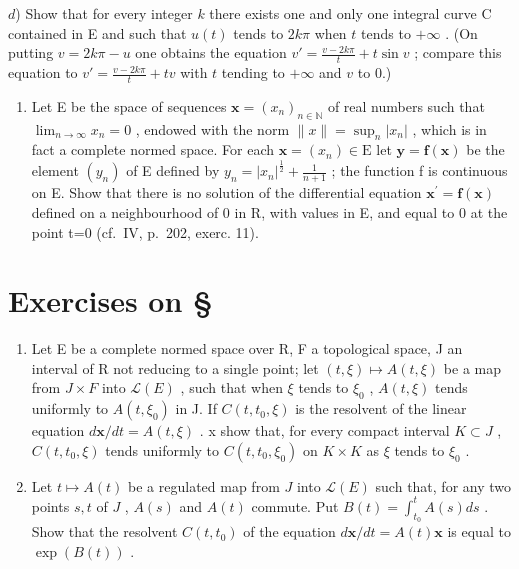 \(d\)) Show that for every integer \(k\) there exists one and only one integral curve C contained in E and such that \(u(t)\) tends to \(2k\pi\) when \(t\) tends to \(+\infty\) . (On putting \(v = 2k\pi - u\) one obtains the equation \(v' = \frac{v - 2k\pi}{t} + t \sin v\) ; compare this equation to \(v' = \frac{v - 2k\pi}{t} + tv\) with \(t\) tending to \(+\infty\) and \(v\) to 0.)

\begin{enumerate}
\def\labelenumi{\arabic{enumi})}
\setcounter{enumi}{17}
\tightlist
\item
  Let E be the space of sequences \(\mathbf{x}=(x_{n})_{n\in\mathbb{N}}\) of real numbers such that \(\lim_{n\to\infty}x_{n}=0\) , endowed with the norm \(\|x\|=\sup_{n}|x_{n}|\) , which is in fact a complete normed space. For each \(\mathbf{x}=(x_{n})\in\mathrm{E}\) let \(\mathbf{y}=\mathbf{f}(\mathbf{x})\) be the element \((y_{n})\) of E defined by \(y_{n}=|x_{n}|^{\frac{1}{2}}+\frac{1}{n+1}\) ; the function f is continuous on E. Show that there is no solution of the differential equation \(\mathbf{x}^{\prime}=\mathbf{f}(\mathbf{x})\) defined on a neighbourhood of 0 in R, with values in E, and equal to 0 at the point t=0 (cf.~IV, p.~202, exerc. 11).
\end{enumerate}

\setcounter{exercisegroup}{1}
\section*{Exercises on \S{}}
{}

\begin{enumerate}
\def\labelenumi{\arabic{enumi})}
\item
  Let E be a complete normed space over R, F a topological space, J an interval of R not reducing to a single point; let \((t, \xi) \mapsto A(t, \xi)\) be a map from \(J \times F\) into \(\mathcal{L}(E)\) , such that when \(\xi\) tends to \(\xi_{0}\) , \(A(t, \xi)\) tends uniformly to \(A(t, \xi_{0})\) in J. If \(C(t, t_{0}, \xi)\) is the resolvent of the linear equation \(d\mathbf{x}/dt = A(t, \xi)\) . x show that, for every compact interval \(K \subset J\) , \(C(t, t_{0}, \xi)\) tends uniformly to \(C(t, t_{0}, \xi_{0})\) on \(K \times K\) as \(\xi\) tends to \(\xi_{0}\) .
\item
  Let \(t \mapsto A(t)\) be a regulated map from \(J\) into \(\mathcal{L}(E)\) such that, for any two points \(s, t\) of \(J\) , \(A(s)\) and \(A(t)\) commute. Put \(B(t) = \int_{t_0}^{t} A(s) ds\) . Show that the resolvent \(C(t, t_0)\) of the equation \(d\mathbf{x}/dt = A(t)\mathbf{x}\) is equal to \(\exp(B(t))\) .
\end{enumerate}

